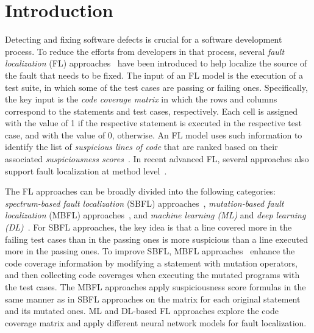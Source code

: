 \section{Introduction}

Detecting and fixing software defects is crucial for a software
development process. To reduce the efforts from developers in that
process, several {\em fault localization} (FL)
approaches~\cite{fl-survey} have been introduced to help localize the
source of the fault that needs to be fixed. The input of an FL model
is the execution of a test suite, in which some of the test cases are
passing or failing ones. Specifically, the key input is the {\em code
  coverage matrix} in which the rows and columns correspond to the
statements and test cases, respectively.  Each cell is assigned with
the value of 1 if the respective statement is executed in the
respective test case, and with the value of 0, otherwise.  An FL model
uses such information to identify the list of {\em suspicious lines of
  code} that are ranked based on their associated {\em suspiciousness
  scores}~\cite{fl-survey}. In recent advanced FL, several approaches
also support fault localization at method
level~\cite{DeepFL,icse21-fl}. 




The FL approaches can be broadly divided into the following
categories: {\em spectrum-based fault localization} (SBFL)
approaches~\cite{Ochiai,jones2001visualization,keller2017critical},
{\em mutation-based fault localization} (MBFL)
approaches~\cite{MUSE,papadakis2012using,Metallaxis}, and {\em machine
  learning (ML)} and {\em deep learning (DL)}~\cite{deepFL,icse21-fl}.
For SBFL approaches, the key idea is that a line covered more in the
failing test cases than in the passing ones is more suspicious than a
line executed more in the passing ones.
%
To improve SBFL, MBFL
approaches~\cite{MUSE,papadakis2012using,Metallaxis} enhance the code
coverage information by modifying a statement with mutation operators,
and then collecting code coverages when executing the mutated programs
with the test cases. The MBFL approaches apply suspiciousness score
formulas in the same manner as in SBFL approaches on the matrix for
each original statement and its mutated ones.
%
ML and DL-based FL approaches explore the code coverage matrix and
apply different neural network models for fault localization.



